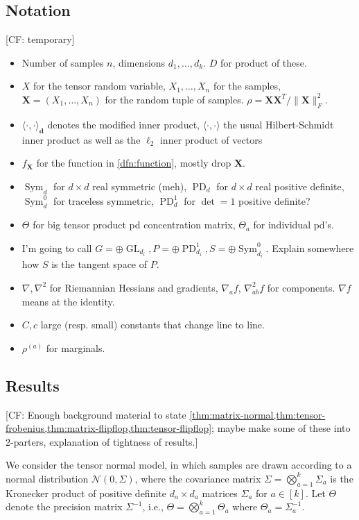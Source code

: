 \documentclass{article}
\renewcommand{\vec}{\bm}
\newcommand\cN{\mathcal{N}}
\newcommand\PD{\operatorname{PD}}
\newcommand\Sym{\operatorname{Sym}}
\newcommand\GL{\operatorname{GL}}
\newcommand{\CF}[1]{{\color{purple}[CF: #1]}}
\newcommand{\MW}[1]{{\color{red}[MW: #1]}}
\begin{document}
\subsection{Notation}
\CF{temporary}
\begin{itemize}
\item Number of samples $n$, dimensions $d_1, \dots, d_k$. $D$ for product of these.
\item $X$ for the tensor random variable, $X_1, \dots, X_n$ for the samples, $\vec X = (X_1, \dots, X_n)$ for the random tuple of samples.
$\rho = \vec X \vec X^T/\|\vec X\|_F^2$.
\item $\langle \cdot, \cdot \rangle_{\vec d}$ denotes the modified inner product, $\langle \cdot, \cdot \rangle$ the usual Hilbert-Schmidt inner product as well as the $\ell_2$ inner product of vectors
\item $f_{\vec X}$ for the function in \cref{dfn:function}, mostly drop $\vec X$.
\item $\Sym_d$ for $d \times d$ real symmetric (meh), $\PD_d$ for $d \times d$ real positive definite, $\Sym_d^0$ for traceless symmetric, $\PD_d^1$ for $\det=1$ positive definite?
\item $\Theta$ for big tensor product pd concentration matrix, $\Theta_a$ for individual pd's.
\item I'm going to call $G = \oplus \GL_{d_i}, P = \oplus \PD_{d_i}^1, S = \oplus \Sym_{d_i}^0$. Explain somewhere how $S$ is the tangent space of $P$.
\item $\nabla, \nabla^2$ for Riemannian Hessians and gradients, $\nabla_a f$, $\nabla^2_{ab} f$ for components. $\nabla f$ means at the identity.
\item $C, c$ large (resp. small) constants that change line to line.
\item $\rho^{(a)}$ for marginals.
\end{itemize}

\subsection{Results}

\CF{Enough background material to state \cref{thm:matrix-normal,thm:tensor-frobenius,thm:matrix-flipflop,thm:tensor-flipflop}; maybe make some of these into 2-parters, explanation of tightness of results.}

We consider the tensor normal model, in which samples are drawn according to a normal distribution $\cN(0, \Sigma)$, where the covariance matrix $\Sigma = \bigotimes_{a = 1}^{k} \Sigma_a$ is the Kronecker product of positive definite $d_a\times d_a$ matrices $\Sigma_a$ for $a\in [k]$.
Let $\Theta$ denote the precision matrix $\Sigma^{-1}$, i.e., $\Theta = \bigotimes_{a=1}^k \Theta_a$ where $\Theta_a = \Sigma_a^{-1}$.
\end{document}
